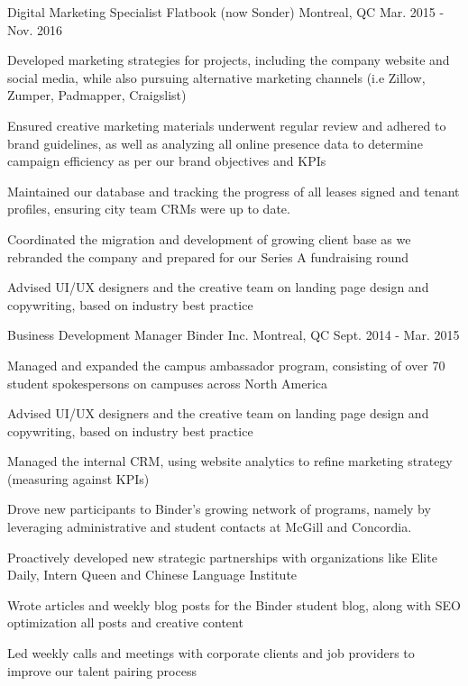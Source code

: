 \begin{cventries}
  \cventry
    {Digital Marketing Specialist} %
    {Flatbook (now Sonder)} %
    {Montreal, QC} %
    {Mar. 2015 - Nov. 2016} %
    {
      \begin{cvitems} %
        \item {Developed marketing strategies for projects, including the company website and social media, while also pursuing alternative marketing channels (i.e Zillow, Zumper, Padmapper, Craigslist)}
        \item {Ensured creative marketing materials underwent regular review and adhered to brand guidelines, as well as analyzing all online presence data to determine campaign efficiency as per our brand objectives and KPIs}
        \item {Maintained our database and tracking the progress of all leases signed and tenant profiles, ensuring city team CRMs were up to date.}
        \item {Coordinated the migration and development of growing client base as we rebranded the company and prepared for our Series A fundraising round}
        \item {Advised UI/UX designers and the creative team on landing page design and copywriting, based on industry best practice}
      \end{cvitems}
    }

  \cventry
    {Business Development Manager} %
    {Binder Inc.} %
    {Montreal, QC} %
    {Sept. 2014 - Mar. 2015} %
    {
      \begin{cvitems} %
        \item {Managed and expanded the campus ambassador program, consisting of over 70 student spokespersons on campuses across North America}
        \item {Advised UI/UX designers and the creative team on landing page design and copywriting, based on industry best practice}
        \item {Managed the internal CRM, using website analytics to refine marketing strategy (measuring against KPIs)}
        \item {Drove new participants to Binder’s growing network of programs, namely by leveraging administrative and student contacts at McGill and Concordia.}
        \item {Proactively developed new strategic partnerships with organizations like Elite Daily, Intern Queen and Chinese Language Institute}
        \item {Wrote articles and weekly blog posts for the Binder student blog, along with SEO optimization all posts and creative content}
        \item {Led weekly calls and meetings with corporate clients and job providers to improve our talent pairing process}
      \end{cvitems}
    }


\end{cventries}
